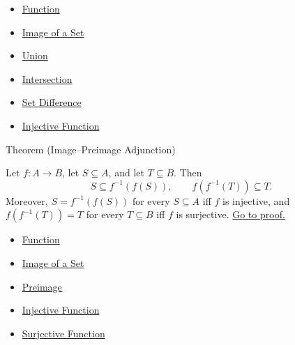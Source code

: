 \begin{dependencies}
\begin{itemize}
  \item \hyperref[def:function]{Function}
  \item \hyperref[def:image-set]{Image of a Set}
  \item \hyperref[def:union]{Union}
  \item \hyperref[def:intersection]{Intersection}
  \item \hyperref[def:set-difference]{Set Difference}
  \item \hyperref[def:injective]{Injective Function}
\end{itemize}
\end{dependencies}

\begin{theorembox}{Theorem (Image--Preimage Adjunction)}
\begin{theorem}\label{thm:image-preimage-adjunction}
Let $f:A\to B$, let $S\subseteq A$, and let $T\subseteq B$. Then
\[
S\subseteq f^{-1}(f(S)),
\qquad
f(f^{-1}(T))\subseteq T.
\]
Moreover, $S=f^{-1}(f(S))$ for every $S\subseteq A$ iff $f$ is injective, and
$f(f^{-1}(T))=T$ for every $T\subseteq B$ iff $f$ is surjective.
\hyperref[prf:image-preimage-adjunction]{Go to proof.}
\end{theorem}
\end{theorembox}

\begin{dependencies}
\begin{itemize}
  \item \hyperref[def:function]{Function}
  \item \hyperref[def:image-set]{Image of a Set}
  \item \hyperref[def:preimage]{Preimage}
  \item \hyperref[def:injective]{Injective Function}
  \item \hyperref[def:surjective]{Surjective Function}
\end{itemize}
\end{dependencies}

